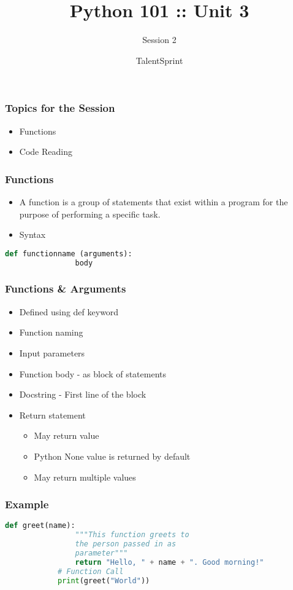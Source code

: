 \documentclass[14pt]{beamer}
\title{Python 101 :: Unit 3}
\subtitle{Session 2}
\date{}
\author[TS]{TalentSprint}
\begin{document}
    \begin{frame}
        \titlepage
    \end{frame}
    \begin{frame}
        \frametitle{Topics for the Session}
        \begin{itemize}
            \item Functions
            \item Code Reading
        \end{itemize}
    \end{frame}
    \begin{frame}[containsverbatim]
        \frametitle{Functions}
        \begin{itemize}
            \item A function is a group of statements that exist within a
program for the purpose of performing a specific task.
            \item \alert{Syntax}
        \end{itemize}
        \begin{lstlisting}[language=Python]
            def functionname (arguments):
                body
        \end{lstlisting}
    \end{frame}
    \begin{frame}
        \frametitle{Functions \& Arguments}
        \begin{itemize}
            \item Defined using \alert{def} keyword
            \item Function naming
            \item Input parameters
            \item Function body - as block of statements
            \item Docstring - First line of the block
            \item Return statement
            \begin{itemize}
                \item May return value
                \item Python None value is returned by default
                \item May return multiple values
            \end{itemize}    
    \end{itemize}
    \end{frame}
    \begin{frame}[containsverbatim]
        \frametitle{Example}
        \begin{lstlisting}[language=Python]
            def greet(name):
                """This function greets to
                the person passed in as
                parameter"""
                return "Hello, " + name + ". Good morning!"
            # Function Call
            print(greet("World"))
        \end{lstlisting}
    \end{frame}
\end{document}
